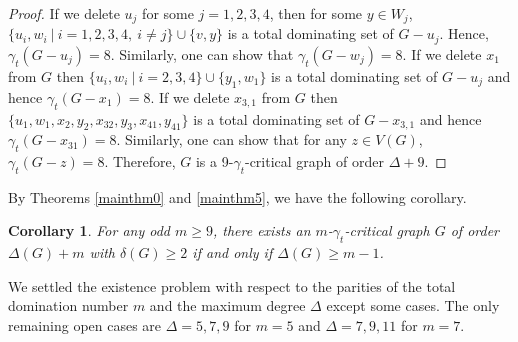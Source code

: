 \documentclass[12pt]{amsart}
\newtheorem{cor}[thm]{Corollary}
\begin{document}
\begin{proof}
 If we delete  $u_j$ for some $j=1,2,3,4$, then for some $y \in W_j$, $\{u_i, w_i \ | \ i=1,2,3,4, ~i\neq j \} \cup \{ v,y \}$ is a total dominating set of $G-u_j$. Hence, $\gamma_t(G-u_j)=8$. Similarly, one can show that $\gamma_t(G-w_j)=8$. If we delete $x_1$ from $G$ then $\{u_i, w_i \ | \ i=2,3,4 \} \cup \{ y_1,w_1 \}$ is a total dominating set of $G-u_j$ and hence $\gamma_t(G-x_1)=8$. If we delete $x_{3,1}$ from $G$ then
 $\{u_1, w_1 , x_2, y_2, x_{3 2}, y_3, x_{4 1}, y_{4 1} \}$ is a total dominating set of $G-x_{3,1}$ and hence $\gamma_t(G-x_{3 1})=8$. Similarly, one can show that for any $z \in V(G)$, $\gamma_t(G-z)=8$. Therefore, $G$ is a 9-$\gamma_t$-critical graph of order $\Delta + 9$.
\end{proof}

By Theorems \ref{mainthm0} and \ref{mainthm5}, we have the following corollary.

\begin{cor} \label{m>=9summary}
For any odd $m \ge 9$, there exists an $m$-$\gamma_{t}$-critical graph $G$ of order $\Delta(G) +m$ with $\delta(G) \ge 2$ if and only if   $\Delta(G) \ge
m-1$.
\end{cor}

 We settled the
existence problem with respect to the parities of the total
domination number $m$ and the maximum degree $\Delta$ except some cases. The only remaining open cases are $ \Delta =5,7,9$ for $m=5$ and $\Delta =7,9,11$ for $m=7$.
\end{document}
